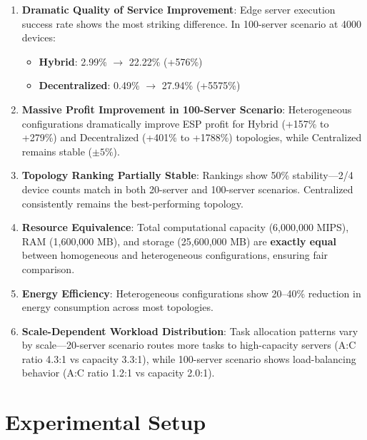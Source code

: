 \documentclass[conference]{IEEEtran}
\begin{document}
\begin{enumerate}
    \item \textbf{Dramatic Quality of Service Improvement}: Edge server execution success rate shows the most striking difference. In 100-server scenario at 4000 devices:
    \begin{itemize}
        \item \textbf{Hybrid}: 2.99\% $\rightarrow$ 22.22\% (+576\%)
        \item \textbf{Decentralized}: 0.49\% $\rightarrow$ 27.94\% (+5575\%)
    \end{itemize}

    \item \textbf{Massive Profit Improvement in 100-Server Scenario}: Heterogeneous configurations dramatically improve ESP profit for Hybrid (+157\% to +279\%) and Decentralized (+401\% to +1788\%) topologies, while Centralized remains stable ($\pm5\%$).

    \item \textbf{Topology Ranking Partially Stable}: Rankings show 50\% stability---2/4 device counts match in both 20-server and 100-server scenarios. Centralized consistently remains the best-performing topology.

    \item \textbf{Resource Equivalence}: Total computational capacity (6,000,000 MIPS), RAM (1,600,000 MB), and storage (25,600,000 MB) are \textbf{exactly equal} between homogeneous and heterogeneous configurations, ensuring fair comparison.

    \item \textbf{Energy Efficiency}: Heterogeneous configurations show 20--40\% reduction in energy consumption across most topologies.

    \item \textbf{Scale-Dependent Workload Distribution}: Task allocation patterns vary by scale---20-server scenario routes more tasks to high-capacity servers (A:C ratio 4.3:1 vs capacity 3.3:1), while 100-server scenario shows load-balancing behavior (A:C ratio 1.2:1 vs capacity 2.0:1).
\end{enumerate}

\section{Experimental Setup}
\end{document}
